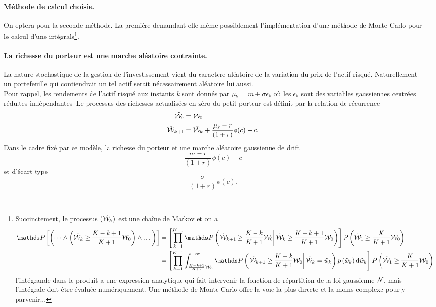 \documentclass{article}
\numberwithin{equation}{section}
\begin{document}
\paragraph{Méthode de calcul choisie.} On optera pour la seconde méthode. La première demandant elle-même possiblement l'implémentation d'une méthode de Monte-Carlo pour le calcul d'une intégrale\footnote{Succinctement, le processus $(\tilde{\mathcal{W}}_k)$ est une chaîne de Markov et on a
\begin{equation*}
\begin{split}
\mathds P\left[ \left(\dots\wedge \left(\tilde\W_k\geq\frac{K - k + 1}{K + 1}\W_0\right)\wedge \dots\right) \right] &= \left[\prod_{k = 1}^{K - 1} \mathds P\left( \left. \tilde\W_{k+1}\geq\frac{K - k}{K + 1}\W_0 \right| \tilde\W_k\geq\frac{K - k + 1}{K + 1}\W_0 \right)\right]P\left( \tilde\W_{1}\geq\frac{K}{K + 1}\W_0\right)\\
&= \left[\prod_{k = 1}^{K - 1} \int_{\frac{K - k + 1}{K + 1}\W_0}^{+\infty}\mathds P\left( \left. \tilde\W_{k+1}\geq\frac{K - k}{K + 1}\W_0 \right| \tilde\W_k=\tilde w_k \right) p\left(\tilde w_k\right) \diff\tilde w_k\right]P\left( \tilde\W_{1}\geq\frac{K}{K + 1}\W_0\right)\\
\end{split}
\end{equation*}
\noindent l'intégrande dans le produit a une expression analytique qui fait intervenir la fonction de répartition de la loi gaussienne $\mathcal{N}$, mais l'intégrale doit être évaluée numériquement. Une méthode de Monte-Carlo offre la voie la plus directe et la moins complexe pour y parvenir...
}.

\paragraph{La richesse du porteur est une marche aléatoire contrainte.} La nature stochastique de la gestion de l'investissement vient du caractère aléatoire de la variation du prix de l'actif risqué. Naturellement, un portefeuille qui contiendrait un tel actif serait nécessairement aléatoire lui aussi.\\

Pour rappel, les rendements de l'actif risqué aux instants $k$ sont donnés par
$
\mu_k = m + \sigma \epsilon_k
$
où les $\epsilon_k$ sont des variables gaussiennes centrées réduites indépendantes. Le processus des richesses actualisées en zéro du petit porteur est définit par la relation de récurrence
\begin{equation*}
\begin{split}
\tilde {\mathcal{W}}_0 &=  \mathcal{W}_0\\
\tilde{\mathcal{W}}_{k + 1} &= \tilde{\mathcal{W}}_k + \frac{\mu_k - r}{(1 + r)}\phi(c) - c.
\end{split}
\end{equation*}
Dans le cadre fixé par ce modèle, la richesse du porteur et une marche aléatoire gaussienne de drift 
$$
\frac{m - r}{(1 + r)}\phi(c) - c
$$
et d'écart type
$$
\frac{\sigma}{(1 + r)}\phi(c).
$$\\
\end{document}
